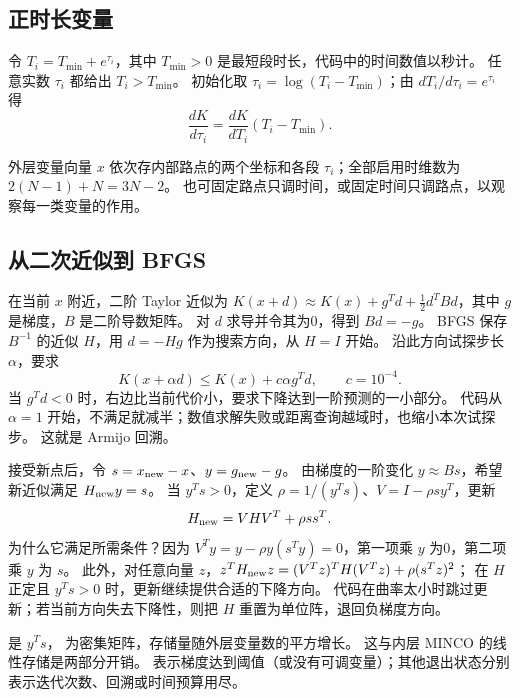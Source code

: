 \subsection{正时长变量}
令 $T_i=T_{\min}+e^{\tau_i}$，其中 $T_{\min}>0$ 是最短段时长，代码中的时间数值以秒计。
任意实数 $\tau_i$ 都给出 $T_i>T_{\min}$。
初始化取 $\tau_i=\log(T_i-T_{\min})$；由 $dT_i/d\tau_i=e^{\tau_i}$ 得
\[
 \frac{dK}{d\tau_i}=\frac{dK}{dT_i}(T_i-T_{\min}).
\]
\par\noindent
\begin{minipage}{\linewidth}

\end{minipage}
\par
外层变量向量 $x$ 依次存内部路点的两个坐标和各段 $\tau_i$；全部启用时维数为 $2(N-1)+N=3N-2$。
也可固定路点只调时间，或固定时间只调路点，以观察每一类变量的作用。

\subsection{从二次近似到 BFGS}
在当前 $x$ 附近，二阶 Taylor 近似为
$K(x+d)\approx K(x)+g^Td+\tfrac12d^TBd$，其中 $g$ 是梯度，$B$ 是二阶导数矩阵。
对 $d$ 求导并令其为0，得到 $Bd=-g$。
BFGS 保存 $B^{-1}$ 的近似 $H$，用 $d=-Hg$ 作为搜索方向，从 $H=I$ 开始。
沿此方向试探步长 $\alpha$，要求
\[
 K(x+\alpha d)\le K(x)+c\alpha g^Td,\qquad c=10^{-4}.
\]
当 $g^Td<0$ 时，右边比当前代价小，要求下降达到一阶预测的一小部分。
代码从 $\alpha=1$ 开始，不满足就减半；数值求解失败或距离查询越域时，也缩小本次试探步。
这就是 Armijo 回溯。

接受新点后，令 $s=x_{\rm new}-x$、$y=g_{\rm new}-g$。
由梯度的一阶变化 $y\approx Bs$，希望新近似满足 $H_{\rm new}y=s$。
当 $y^Ts>0$，定义 $\rho=1/(y^Ts)$、$V=I-\rho sy^T$，更新
\begin{equation}
 H_{\rm new}=VHV^T+\rho ss^T.
\end{equation}
为什么它满足所需条件？因为 $V^Ty=y-\rho y(s^Ty)=0$，第一项乘 $y$ 为0，第二项乘 $y$ 为 $s$。
此外，对任意向量 $z$，$z^TH_{\rm new}z=(V^Tz)^TH(V^Tz)+\rho(s^Tz)^2$；
在 $H$ 正定且 $y^Ts>0$ 时，更新继续提供合适的下降方向。
代码在曲率太小时跳过更新；若当前方向失去下降性，则把 $H$ 重置为单位阵，退回负梯度方向。
\par\noindent
\begin{minipage}{\linewidth}

\end{minipage}
\par
{} 是 $y^Ts$， 为密集矩阵，存储量随外层变量数的平方增长。
这与内层 MINCO 的线性存储是两部分开销。
 表示梯度达到阈值（或没有可调变量）；其他退出状态分别表示迭代次数、回溯或时间预算用尽。

